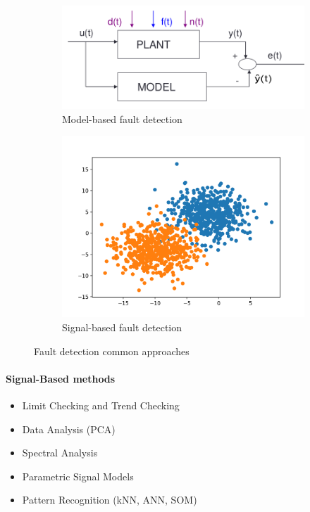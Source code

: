 \documentclass[class=article, crop=false]{standalone}
\begin{document}
\begin{figure}[h]
    \centering
\begin{subfigure}{0.5\textwidth}
    \includegraphics[width=0.9\linewidth]{model_based.png}
    \caption{Model-based fault detection}
    \label{fig:model_based}
\end{subfigure}%
\begin{subfigure}{0.5\textwidth}
    \includegraphics[width=0.9\linewidth]{signal_based.png}
    \caption{Signal-based fault detection}
    \label{fig:signal_based}
\end{subfigure}
\caption{Fault detection common approaches}
\label{fig:fault_detection}
\end{figure}

\paragraph{Signal-Based methods}
\begin{itemize}
    \item Limit Checking and Trend Checking
    \item Data Analysis (PCA)
    \item Spectral Analysis
    \item Parametric Signal Models
    \item Pattern Recognition (kNN, ANN, SOM)
\end{itemize}
\end{document}
